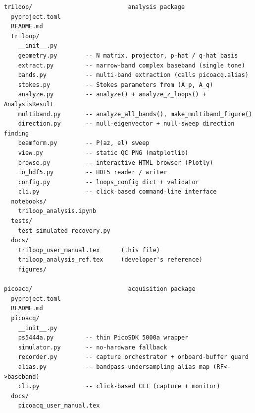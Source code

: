 \documentclass[11pt]{article}
\begin{document}
\begin{lstlisting}[style=shell]
triloop/                           analysis package
  pyproject.toml
  README.md
  triloop/
    __init__.py
    geometry.py        -- N matrix, projector, p-hat / q-hat basis
    extract.py         -- narrow-band complex baseband (single tone)
    bands.py           -- multi-band extraction (calls picoacq.alias)
    stokes.py          -- Stokes parameters from (A_p, A_q)
    analyze.py         -- analyze() + analyze_z_loops() + AnalysisResult
    multiband.py       -- analyze_all_bands(), make_multiband_figure()
    direction.py       -- null-eigenvector + null-sweep direction finding
    beamform.py        -- P(az, el) sweep
    view.py            -- static QC PNG (matplotlib)
    browse.py          -- interactive HTML browser (Plotly)
    io_hdf5.py         -- HDF5 reader / writer
    config.py          -- loops_config dict + validator
    cli.py             -- click-based command-line interface
  notebooks/
    triloop_analysis.ipynb
  tests/
    test_simulated_recovery.py
  docs/
    triloop_user_manual.tex      (this file)
    triloop_analysis_ref.tex     (developer's reference)
    figures/

picoacq/                           acquisition package
  pyproject.toml
  README.md
  picoacq/
    __init__.py
    ps5444a.py         -- thin PicoSDK 5000a wrapper
    simulator.py       -- no-hardware fallback
    recorder.py        -- capture orchestrator + onboard-buffer guard
    alias.py           -- bandpass-undersampling alias map (RF<->baseband)
    cli.py             -- click-based CLI (capture + monitor)
  docs/
    picoacq_user_manual.tex
\end{lstlisting}
\end{document}
